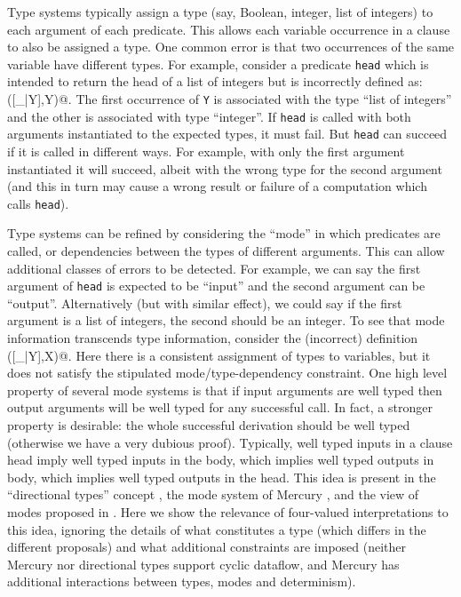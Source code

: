 \documentclass{tlp}
\begin{document}
Type systems typically assign a type (say, Boolean, integer, list of
integers) to each argument of each predicate.  This allows each variable
occurrence in a clause to also be assigned a type.  One common error
is that two occurrences of the same variable have different types.
For example, consider a predicate \texttt{head} which is intended to
return the head of a list of integers but is incorrectly defined as:
\verb@head([_|Y],Y)@.  The first occurrence of \texttt{Y} is associated
with the type ``list of integers'' 
and the other is associated with type ``integer''.
If \texttt{head} is called with both arguments instantiated to the
expected types, it must fail.  But \texttt{head} can succeed if it
is called in different ways.  For example, with only the first argument
instantiated it will succeed, albeit with the wrong type for the second
argument (and this in turn may cause a wrong result or failure of a 
computation which calls \texttt{head}).

Type systems can be refined by considering the ``mode'' in which
predicates are called, or dependencies between the types of different
arguments.  This can allow additional classes of errors to be detected.
For example, we can say the first argument of \texttt{head} is expected
to be ``input'' and the second argument can be ``output''.  Alternatively
(but with similar effect), we could say if the first argument is a list
of integers, the second should be an integer.  
To see that mode information transcends type information, consider the
(incorrect) definition \verb@head([_|Y],X)@.
Here there is a consistent assignment of types to variables, 
but it does not satisfy the stipulated mode/type-dependency constraint.
One high level property of several mode systems is that if input
arguments are well typed then output arguments will be well typed for
any successful call.  
In fact, a stronger property is desirable: the whole successful derivation
should be well typed (otherwise we have a very dubious proof).  Typically,
well typed inputs in a clause head imply well typed inputs in the body,
which implies well typed outputs in body, which implies well typed
outputs in the head.  This idea is present in the ``directional types''
concept \cite{Aiken-sas94,boye95}, the mode system of Mercury
\cite{mercury}, and the view of modes proposed in .
Here we show the relevance of four-valued interpretations to this idea,
ignoring the details of what constitutes a type (which differs in the
different proposals) and what additional constraints are imposed 
(neither Mercury nor directional types support cyclic dataflow, 
and Mercury has additional interactions between types, 
modes and determinism).
\end{document}
